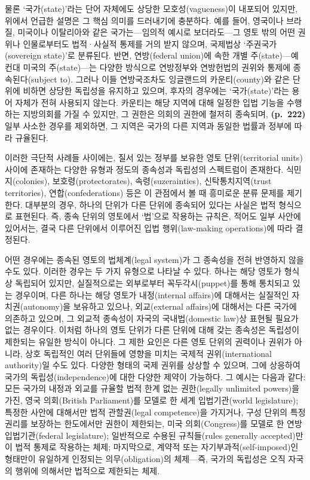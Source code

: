 물론 `국가(state)'라는 단어 자체에도 상당한 모호성(vagueness)이 내포되어
있지만, 위에서 언급한 설명은 그 핵심 의미를 드러내기에 충분하다. 예를
들어, 영국이나 브라질, 미국이나 이탈리아와 같은 국가는---임의적 예시로
보더라도---그 영토 밖의 어떤 권위나 인물로부터도 법적·사실적 통제를 거의
받지 않으며, 국제법상 `주권국가(sovereign state)'로 분류된다. 반면,
연방(federal union)에 속한 개별 주(state)---예컨대 미국의 주(state)---는
다양한 방식으로 연방정부와 연방헌법의 권위와 통제에 종속된다(subject
to). 그러나 이들 연방국조차도 잉글랜드의 카운티(county)와 같은 단위에
비하면 상당한 독립성을 유지하고 있으며, 후자의 경우에는
`국가(state)'라는 용어 자체가 전혀 사용되지 않는다. 카운티는 해당 지역에
대해 일정한 입법 기능을 수행하는 지방의회를 가질 수 있지만, 그 권한은
의회의 권한에 철저히 종속되며, \textbf{(p.~222)} 일부 사소한 경우를
제외하면, 그 지역은 국가의 다른 지역과 동일한 법률과 정부에 따라
규율된다.

이러한 극단적 사례들 사이에는, 질서 있는 정부를 보유한 영토
단위(territorial units) 사이에 존재하는 다양한 유형과 정도의 종속성과
독립성의 스펙트럼이 존재한다. 식민지(colonies), 보호령(protectorates),
속령(suzerainties), 신탁통치지역(trust territories),
연합(confederations) 등은 이 관점에서 볼 때 흥미로운 분류 문제를
제기한다. 대부분의 경우, 하나의 단위가 다른 단위에 종속되어 있다는
사실은 법적 형식으로 표현된다. 즉, 종속 단위의 영토에서 `법'으로
작용하는 규칙은, 적어도 일부 사안에 있어서는, 결국 다른 단위에서
이루어진 입법 행위(law-making operations)에 따라 결정된다.

어떤 경우에는 종속된 영토의 법체계(legal system)가 그 종속성을 전혀
반영하지 않을 수도 있다. 이러한 경우는 두 가지 유형으로 나타날 수 있다.
하나는 해당 영토가 형식상 독립되어 있지만, 실질적으로는 외부로부터
꼭두각시(puppet)를 통해 통치되고 있는 경우이며, 다른 하나는 해당 영토가
내정(internal affairs)에 대해서는 실질적인 자치권(autonomy)을 보유하고
있으나, 외교(external affairs)에 대해서는 다른 국가에 의존하고 있으며,
그 외교적 종속성이 자국의 국내법(domestic law)상 표현될 필요가 없는
경우이다. 이처럼 하나의 영토 단위가 다른 단위에 대해 갖는 종속성은
독립성이 제한되는 유일한 방식이 아니다. 그 제한 요인은 다른 영토 단위의
권력이나 권위가 아니라, 상호 독립적인 여러 단위들에 영향을 미치는 국제적
권위(international authority)일 수도 있다. 다양한 형태의 국제 권위를
상상할 수 있으며, 그에 상응하여 국가의 독립성(independence)에 대한
다양한 제약이 가능하다. 그 예시는 다음과 같다: 모든 국가의 내정과 외교를
규율할 법적 한계 없는 권한(legally unlimited powers)을 가진, 영국
의회(British Parliament)를 모델로 한 세계 입법기관(world legislature);
특정한 사안에 대해서만 법적 관할권(legal competence)을 가지거나, 구성
단위의 특정 권리를 보장하는 한도에서만 권한이 제한되는, 미국
의회(Congress)를 모델로 한 연방 입법기관(federal legislature);
일반적으로 수용된 규칙들(rules generally accepted)만이 법적 통제로
작용하는 체제; 마지막으로, 계약적 또는 자기부과적(self-imposed)인
형태만이 유일하게 인정되는 의무(obligation)의 체제---즉, 국가의 독립성은
오직 자국의 행위에 의해서만 법적으로 제한되는 체제.

